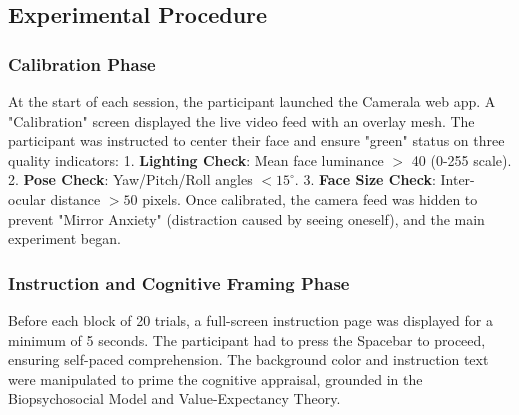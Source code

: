 \documentclass[journal]{IEEEtran}
\begin{document}
\subsection{Experimental Procedure}
\subsubsection{Calibration Phase}
At the start of each session, the participant launched the Camerala web app. A "Calibration" screen displayed the live video feed with an overlay mesh. The participant was instructed to center their face and ensure "green" status on three quality indicators:
1. \textbf{Lighting Check}: Mean face luminance $>$ 40 (0-255 scale).
2. \textbf{Pose Check}: Yaw/Pitch/Roll angles  $< 15^\circ$.
3. \textbf{Face Size Check}: Inter-ocular distance $> 50$ pixels.
Once calibrated, the camera feed was hidden to prevent "Mirror Anxiety" (distraction caused by seeing oneself), and the main experiment began.

\subsubsection{Instruction and Cognitive Framing Phase}
Before each block of 20 trials, a full-screen instruction page was displayed for a minimum of 5 seconds. The participant had to press the Spacebar to proceed, ensuring self-paced comprehension. The background color and instruction text were manipulated to prime the cognitive appraisal, grounded in the Biopsychosocial Model and Value-Expectancy Theory.
\end{document}
